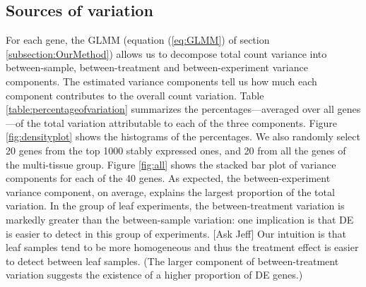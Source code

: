 \documentclass[11pt, a4paper]{article}
\begin{document}



\subsection{Sources of variation}\label{Section:varianceComp}

For each gene, the GLMM (equation (\ref{eq:GLMM}) of section
\ref{subsection:OurMethod}) allows us to decompose total count variance into
between-sample, between-treatment and between-experiment variance components.
The estimated variance components tell us how much each component contributes
to the overall count variation. Table \ref{table:percentageofvariation}
summarizes the percentages---averaged over all genes---of the total variation
attributable to each of the three components.  Figure \ref{fig:densityplot}
shows the histograms of the percentages. We also randomly select 20 genes from
the top 1000 stably expressed ones, and 20 from all the genes of the
multi-tissue group. Figure \ref{fig:all} shows the stacked bar plot of
variance components for each of the 40 genes.  As expected, the
between-experiment variance component, on average, explains the largest
proportion of the total variation.  In the group of leaf experiments, the
between-treatment variation is markedly greater than the between-sample
variation: one implication is that DE is easier to detect in this group of
experiments.  [Ask Jeff] Our intuition is that leaf samples tend to be more
homogeneous and thus the treatment effect is easier to detect between leaf
samples. (The larger component of between-treatment variation suggests the
existence of a higher proportion of DE genes.) 
 
\end{document}
